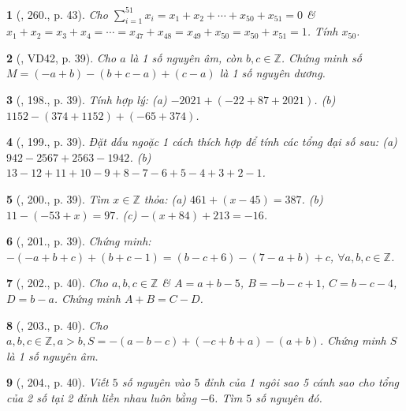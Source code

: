 \documentclass{article}
\newtheorem{baitoan}{}
\begin{document}
\begin{baitoan}[\cite{Binh_Toan_6_tap_1}, 260., p. 43]
	Cho $\sum_{i=1}^{51} x_i = x_1 + x_2 + \cdots + x_{50} + x_{51} = 0$ \& $x_1 + x_2 = x_3 + x_4 = \cdots = x_{47} + x_{48} = x_{49} + x_{50} = x_{50} + x_{51} = 1$. Tính $x_{50}$.
\end{baitoan}

\begin{baitoan}[\cite{Tuyen_Toan_6}, VD42, p. 39]
	Cho $a$ là 1 số nguyên âm, còn $b,c\in\mathbb{Z}$. Chứng minh số $M = (-a + b) - (b + c - a) + (c - a)$ là 1 số nguyên dương.
\end{baitoan}

\begin{baitoan}[\cite{Tuyen_Toan_6}, 198., p. 39]
	Tính hợp lý: (a) $-2021 + (-22 + 87 + 2021)$. (b) $1152 - (374 + 1152) + (-65 + 374)$.
\end{baitoan}

\begin{baitoan}[\cite{Tuyen_Toan_6}, 199., p. 39]
	Đặt dấu ngoặc 1 cách thích hợp để tính các tổng đại số sau: (a) $942 - 2567 + 2563 - 1942$. (b) $13 - 12 + 11 + 10 - 9 + 8 - 7 - 6 + 5 - 4 + 3 + 2 - 1$.
\end{baitoan}

\begin{baitoan}[\cite{Tuyen_Toan_6}, 200., p. 39]
	Tìm $x\in\mathbb{Z}$ thỏa: (a) $461 + (x - 45) = 387$. (b) $11 - (-53 + x) = 97$. (c) $-(x + 84) + 213 = -16$.
\end{baitoan}

\begin{baitoan}[\cite{Tuyen_Toan_6}, 201., p. 39]
	Chứng minh: $-(-a + b + c) + (b + c - 1) = (b - c + 6) - (7 - a + b) + c$, $\forall a,b,c\in\mathbb{Z}$.
\end{baitoan}

\begin{baitoan}[\cite{Tuyen_Toan_6}, 202., p. 40]
	Cho $a,b,c\in\mathbb{Z}$ \& $A = a + b - 5$, $B = -b - c + 1$, $C = b - c - 4$, $D = b - a$. Chứng minh $A + B = C - D$.
\end{baitoan}

\begin{baitoan}[\cite{Tuyen_Toan_6}, 203., p. 40]
	Cho $a,b,c\in\mathbb{Z},a > b,S = -(a - b - c) + (-c + b + a) - (a + b)$. Chứng minh $S$ là 1 số nguyên âm.
\end{baitoan}

\begin{baitoan}[\cite{Tuyen_Toan_6}, 204., p. 40]
	Viết $5$ số nguyên vào $5$ đỉnh của 1 ngôi sao 5 cánh sao cho tổng của 2 số tại 2 đỉnh liền nhau luôn bằng $-6$. Tìm $5$ số nguyên đó.
\end{baitoan}
\end{document}

